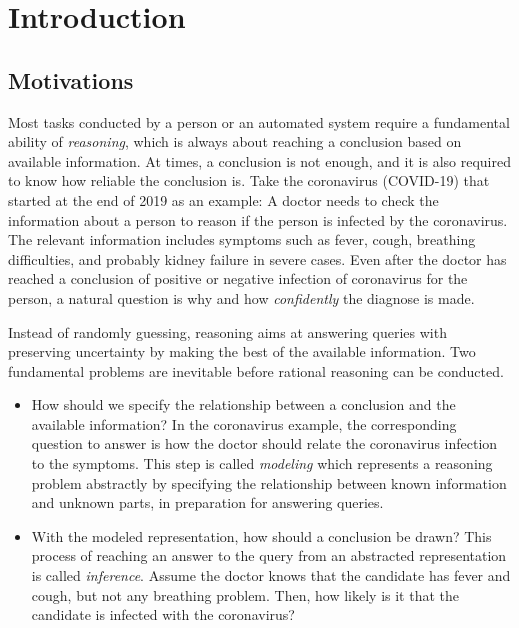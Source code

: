 \chapter{Introduction}
\label{chapter1}

\section{Motivations}
\label{section1.1}

Most tasks conducted by a person or an automated system require a fundamental ability of \textit{reasoning}, which is always about reaching a conclusion based on available information. At times, a conclusion is not enough, and it is also required to know how reliable the conclusion is. Take the coronavirus (COVID-19) that started at the end of 2019 as an example: A doctor needs to check the information about a person to reason if the person is infected by the coronavirus. The relevant information includes symptoms such as fever, cough, breathing difficulties, and probably kidney failure in severe cases. Even after the doctor has reached a conclusion of positive or negative infection of coronavirus for the person, a natural question is why and how \textit{confidently} the diagnose is made.

Instead of randomly guessing, reasoning aims at answering queries with preserving uncertainty by making the best of the available information. Two fundamental problems are inevitable before rational reasoning can be conducted. 
\begin{itemize}
\item How should we specify the relationship between a conclusion and the available information? In the coronavirus example, the corresponding question to answer is how the doctor should relate the coronavirus infection to the symptoms. This step is called \textit{modeling} which represents a reasoning problem abstractly by specifying the relationship between known information and unknown parts, in preparation for answering queries.
\item With the modeled representation, how should a conclusion be drawn? This process of reaching an answer to the query from an abstracted representation is called \textit{inference}. Assume the doctor knows that the candidate has fever and cough, but not any breathing problem. Then, how likely is it that the candidate is infected with the coronavirus?
\end{itemize}


